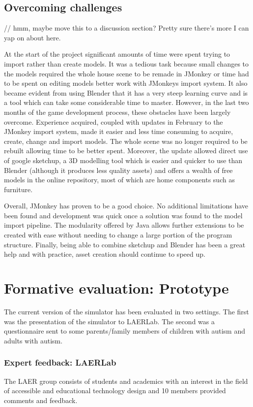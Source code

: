 \documentclass[11pt]{report}
\begin{document}
\section{Overcoming challenges}

// hmm, maybe move this to a discussion section? Pretty sure there's more I can yap on about here. 

At the start of the project significant amounts of time were spent trying to import rather than create models. It was a tedious task because small changes to the models required the whole house scene to be remade in JMonkey or
time had to be spent on editing models better work with JMonkeys import system. It also became evident from using Blender that it has a very steep learning curve and is a tool which can take some considerable time to master.
However, in the last two months of the game development process, these obstacles have been largely overcome. Experience acquired, coupled with updates in February to the JMonkey import system, made it easier and less
time consuming to acquire, create, change and import models. The whole scene was no longer required to be rebuilt allowing time to be better spent. Moreover, the update allowed direct use of google sketchup, a 3D modelling
tool which is easier and quicker to use than Blender (although it produces less quality assets) and offers a wealth of free models in the online repository, most of which are home components such as furniture.

Overall, JMonkey has proven to be a good choice. No additional limitations have been found and development was quick once a solution was found to the model import pipeline. The modularity offered by Java allows
further extensions to be created with ease without needing to change a large portion of the program structure. Finally, being able to combine sketchup and Blender has been a great help and with practice, asset creation should
continue to speed up.

\chapter{Formative evaluation: Prototype}
The current version of the simulator has been evaluated in two settings. The first was the presentation of the simulator to LAERLab. The second was a questionnaire sent to some parents/family members of children with autism and adults with autism.

\subsection{Expert feedback: LAERLab}
The LAER group consists of students and academics with an interest in the field of accessible and educational technology design and 10 members provided comments and feedback.
\end{document}
